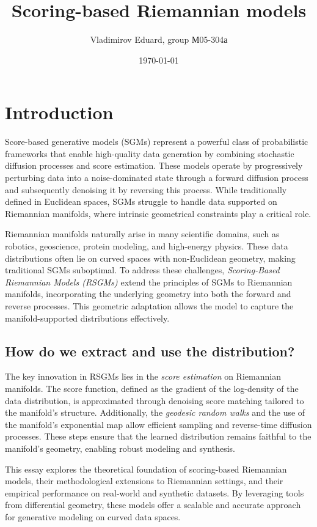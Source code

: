 \documentclass[a4paper,14pt]{article}
\author{Vladimirov Eduard, group М05-304а}
\title{\textbf{Scoring-based Riemannian models}}
\date{\today}
\theoremstyle{plain} %
\theoremstyle{definition} %
\theoremstyle{remark} %
\theoremstyle{definition}
\theoremstyle{remark}
\theoremstyle{remark}
\begin{document}
	\maketitle
	
	\section{Introduction}

	Score-based generative models (SGMs) represent a powerful class of probabilistic frameworks that enable high-quality data generation by combining stochastic diffusion processes and score estimation. These models operate by progressively perturbing data into a noise-dominated state through a forward diffusion process and subsequently denoising it by reversing this process. While traditionally defined in Euclidean spaces, SGMs struggle to handle data supported on Riemannian manifolds, where intrinsic geometrical constraints play a critical role.
	
	Riemannian manifolds naturally arise in many scientific domains, such as robotics, geoscience, protein modeling, and high-energy physics. These data distributions often lie on curved spaces with non-Euclidean geometry, making traditional SGMs suboptimal. To address these challenges, \textit{Scoring-Based Riemannian Models (RSGMs)} extend the principles of SGMs to Riemannian manifolds, incorporating the underlying geometry into both the forward and reverse processes. This geometric adaptation allows the model to capture the manifold-supported distributions effectively.
	
	\subsection{How do we extract and use the distribution?}
	
	The key innovation in RSGMs lies in the \textit{score estimation} on Riemannian manifolds. The score function, defined as the gradient of the log-density of the data distribution, is approximated through denoising score matching tailored to the manifold's structure. Additionally, the \textit{geodesic random walks} and the use of the manifold's exponential map allow efficient sampling and reverse-time diffusion processes. These steps ensure that the learned distribution remains faithful to the manifold's geometry, enabling robust modeling and synthesis.
	
	This essay explores the theoretical foundation of scoring-based Riemannian models, their methodological extensions to Riemannian settings, and their empirical performance on real-world and synthetic datasets. By leveraging tools from differential geometry, these models offer a scalable and accurate approach for generative modeling on curved data spaces.
\end{document}
